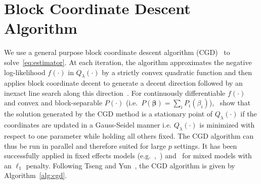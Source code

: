 \documentclass[12pt,letter]{article}\usepackage[]{graphicx}\usepackage[]{color}
\newcommand{\bbeta}{\boldsymbol{\beta}}
\begin{document}
%
%




\newpage

\appendix

\section{Block Coordinate Descent Algorithm} \label{ap:cgd}

We use a general purpose block coordinate descent algorithm (CGD)~\citep{tseng2009coordinate} to solve~\eqref{eq:estimator}. At each iteration, the algorithm approximates the negative log-likelihood $f(\cdot)$ in $Q_{\lambda}(\cdot)$ by a strictly convex quadratic function and then applies block coordinate decent to generate a decent direction followed by an inexact line search along this direction~\citep{tseng2009coordinate}. For continuously differentiable $f(\cdot)$ and convex and block-separable $P(\cdot)$ \mbox{(i.e. $P(\bbeta) = \sum_i P_i (\beta_i)$)},~\cite{tseng2009coordinate} show that the solution generated by the CGD method is a stationary point of $Q_{\lambda}(\cdot)$ if the coordinates are updated in a Gauss-Seidel manner i.e. $Q_{\lambda}(\cdot)$ is minimized with respect to one parameter while holding all others fixed. The CGD algorithm can thus be run in parallel and therefore suited for large $p$ settings. It has been successfully applied in fixed effects models (e.g.~\cite{meier2008group},~\cite{friedman2010regularization}) and~\cite{schelldorfer2011estimation} for mixed models with an $\ell_1$ penalty. Following Tseng and Yun~\cite{tseng2009coordinate}, the CGD algorithm is given by Algorithm~\ref{alg:cgd}.
\end{document}
